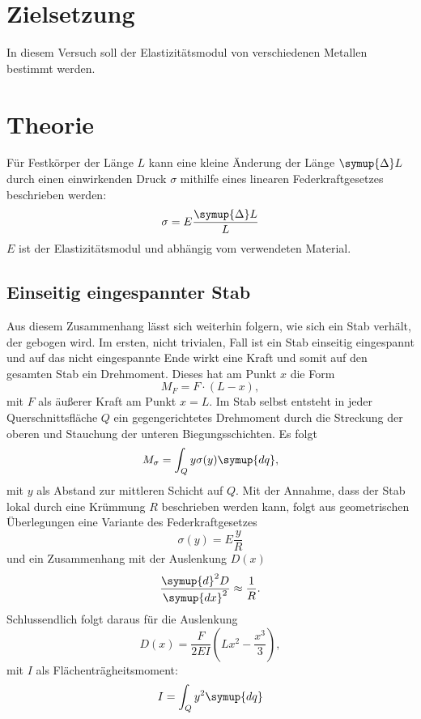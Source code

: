 \section{Zielsetzung}
In diesem Versuch soll der Elastizitätsmodul von verschiedenen Metallen bestimmt werden.
\section{Theorie}
\label{sec:Theorie}
Für Festkörper der Länge $L$ kann eine kleine Änderung der Länge $\symup{\Delta}L$
durch einen einwirkenden Druck $\sigma$
mithilfe eines linearen Federkraftgesetzes beschrieben werden:
\begin{equation}
    \sigma = E\frac{\symup{\Delta}L}{L}
\end{equation}
$E$ ist der Elastizitätsmodul und abhängig vom verwendeten Material.
\subsection{Einseitig eingespannter Stab}
Aus diesem Zusammenhang lässt sich weiterhin folgern, wie sich ein Stab verhält, der gebogen wird.
Im ersten, nicht trivialen, Fall ist ein Stab einseitig eingespannt und auf das nicht eingespannte
Ende wirkt eine Kraft und somit auf den gesamten Stab ein Drehmoment.
Dieses hat am Punkt $x$ die Form
\begin{equation}
    M_F = F\cdot(L-x),
\end{equation}
mit $F$ als äußerer Kraft am Punkt $x=L$.
Im Stab selbst entsteht in jeder Querschnittsfläche $Q$ ein gegengerichtetes Drehmoment durch die
Streckung der oberen und Stauchung der unteren Biegungsschichten.
Es folgt
\begin{equation}
    \label{eq:fltraegheit}
    M_\sigma = \int_Q y \sigma(y) \symup{dq},
\end{equation}
mit $y$ als Abstand zur mittleren Schicht auf $Q$.
Mit der Annahme, dass der Stab lokal durch eine Krümmung $R$ beschrieben werden kann,
folgt aus geometrischen Überlegungen eine Variante des Federkraftgesetzes
\begin{equation}
    \sigma(y) = E\frac{y}{R}
\end{equation}
und ein Zusammenhang mit der Auslenkung $D(x)$
\begin{equation}
    \frac{\symup{d}^2D}{\symup{dx}^2} \approx \frac{1}{R}.
\end{equation}
Schlussendlich folgt daraus für die Auslenkung
\begin{equation}
  \label{eq:e_aus}
    D(x) = \frac{F}{2EI}\left(Lx^2-\frac{x^3}{3}\right),
\end{equation}
mit $I$ als Flächenträgheitsmoment:
\begin{equation}
    I = \int_Qy^2\symup{dq}
\end{equation}
